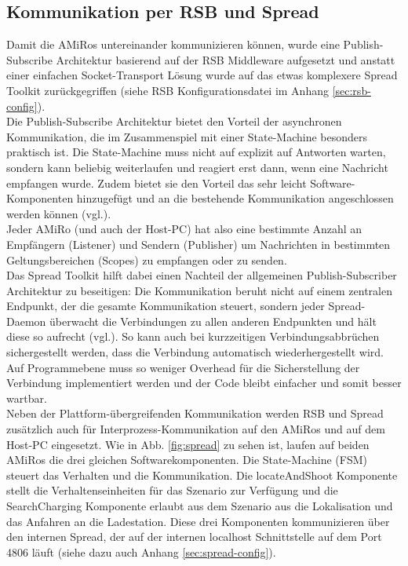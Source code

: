 \vfill

\subsection{Kommunikation per RSB und Spread} %
Damit die AMiRos untereinander kommunizieren können, wurde eine Publish-Subscribe Architektur basierend auf der RSB Middleware aufgesetzt und anstatt einer einfachen Socket-Transport Lösung wurde auf das etwas komplexere Spread Toolkit zurückgegriffen (siehe RSB Konfigurationsdatei im Anhang \ref{sec:rsb-config}).\\
Die Publish-Subscribe Architektur bietet den Vorteil der asynchronen Kommunikation, die im Zusammenspiel mit einer State-Machine besonders praktisch ist. Die State-Machine muss nicht auf explizit auf Antworten warten, sondern kann beliebig weiterlaufen und reagiert erst dann, wenn eine Nachricht empfangen wurde. Zudem bietet sie den Vorteil das sehr leicht Software-Komponenten hinzugefügt und an die bestehende Kommunikation angeschlossen werden können (vgl.\cite{Siciliano:2007}).\\
Jeder AMiRo (und auch der Host-PC) hat also eine bestimmte Anzahl an Empfängern (Listener) und Sendern (Publisher) um Nachrichten in bestimmten Geltungsbereichen (Scopes) zu empfangen oder zu senden.\\%
Das Spread Toolkit hilft dabei einen Nachteil der allgemeinen Publish-Subscriber Architektur zu beseitigen: Die Kommunikation beruht nicht auf einem zentralen Endpunkt, der die gesamte Kommunikation steuert, sondern jeder Spread-Daemon überwacht die Verbindungen zu allen anderen Endpunkten und hält diese so aufrecht (vgl.\cite{Siciliano:2007}). So kann auch bei kurzzeitigen Verbindungsabbrüchen sichergestellt werden, dass die Verbindung automatisch wiederhergestellt wird. Auf Programmebene  muss so weniger Overhead für die Sicherstellung der Verbindung implementiert werden und der Code bleibt einfacher und somit besser wartbar.\\
Neben der Plattform-übergreifenden Kommunikation werden RSB und Spread zusätzlich auch für Interprozess-Kommunikation auf den AMiRos und auf dem Host-PC eingesetzt. Wie in Abb. \ref{fig:spread} zu sehen ist, laufen auf beiden AMiRos die drei gleichen Softwarekomponenten. Die State-Machine (FSM) steuert das Verhalten und die Kommunikation. Die locateAndShoot Komponente stellt die Verhaltenseinheiten für das Szenario zur Verfügung und die SearchCharging Komponente erlaubt aus dem Szenario aus die Lokalisation und das Anfahren an die Ladestation. Diese drei Komponenten kommunizieren über den internen Spread, der auf der internen localhost Schnittstelle auf dem Port 4806 läuft (siehe dazu auch Anhang \ref{sec:spread-config}).\\
